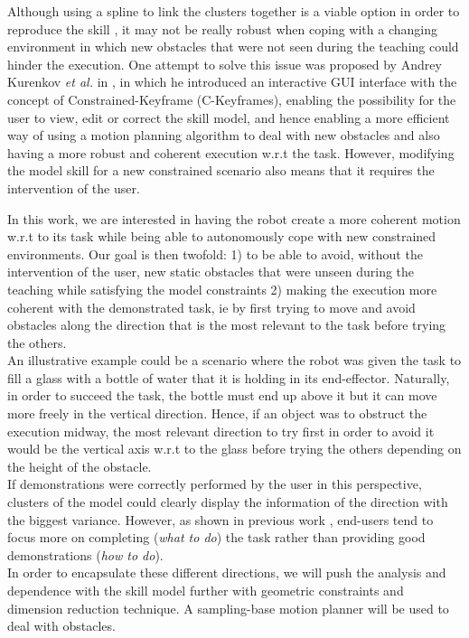 \documentclass[letterpaper, 10 pt, conference]{ieeeconf}  %
\begin{document}
Although using a spline to link the clusters together is a viable option in order to reproduce the skill \cite{refKeyframe1}, it may not be really robust when coping with a changing environment in which new obstacles that were not seen during the teaching could hinder the execution.
One attempt to solve this issue was proposed by Andrey Kurenkov \textit{et al.} in \cite{refCKframes}, in which he introduced an interactive GUI interface with the concept of Constrained-Keyframe (C-Keyframes), enabling the possibility for the user to view, edit or correct the skill model, and hence enabling a more efficient way of using a motion planning algorithm to deal with new obstacles and also having a more robust and coherent execution w.r.t the task.
However, modifying the model skill for a new constrained scenario also means that it requires the intervention of the user. %

In this work, we are interested in having the robot create a more coherent motion w.r.t to its task while being able to autonomously cope with new constrained environments. Our goal is then twofold: 1) to be able to avoid, without the intervention of the user, new static obstacles that were unseen during the teaching while satisfying the model constraints 2) making the execution more coherent with the demonstrated task, ie by first trying to move and avoid obstacles along the direction that is the most relevant to the task before trying the others.\\
An illustrative example could be a scenario where the robot was given the task to fill a glass with a bottle of water that it is holding in its end-effector. Naturally, in order to succeed the task, the bottle must end up above it but it can move more freely in the vertical direction. Hence, if an object was to obstruct the execution midway, the most relevant direction to try first in order to avoid it would be the vertical axis w.r.t to the glass before trying the others depending on the height of the obstacle.\\
If demonstrations were correctly performed by the user in this perspective, clusters of the model could clearly display the information of the direction with the biggest variance. However, as shown in previous work \cite{refKeyframe2} \cite{refKeyframe0}, end-users tend to focus more on completing (\textit{what to do}) the task rather than providing good demonstrations (\textit{how to do}).\\
In order to encapsulate these different directions, we will push the analysis and dependence with the skill model further with geometric constraints and dimension reduction technique. A sampling-base motion planner will be used to deal with obstacles. 
\end{document}
